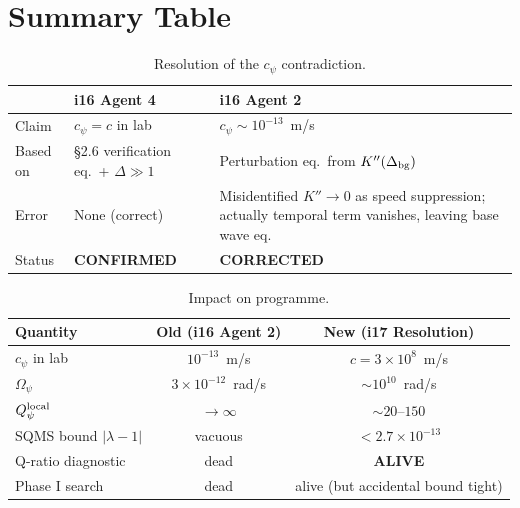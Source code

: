 \documentclass[11pt]{article}
\newcommand{\ee}[1]{\times 10^{#1}}
\newcommand{\Opsi}{\Omega_\psi}
\newcommand{\Qpsi}{Q_\psi}
\theoremstyle{definition}
\theoremstyle{remark}
\begin{document}
\section*{Summary Table}

\begin{table}[H]
\centering
\caption{Resolution of the $c_\psi$ contradiction.}
\begin{tabular}{@{}p{4cm}p{4cm}p{4cm}@{}}
\toprule
& i16 Agent 4 & i16 Agent 2 \\
\midrule
Claim & $c_\psi = c$ in lab & $c_\psi \sim 10^{-13}$~m/s \\
Based on & \S2.6 verification eq.\ + $\Delta \gg 1$ & Perturbation eq.\ from $K''(\Delta_{\rm bg})$ \\
Error & None (correct) & Misidentified $K'' \to 0$ as speed suppression; actually temporal term vanishes, leaving base wave eq. \\
Status & \textbf{CONFIRMED} & \textbf{CORRECTED} \\
\bottomrule
\end{tabular}
\end{table}

\begin{table}[H]
\centering
\caption{Impact on programme.}
\begin{tabular}{@{}lcc@{}}
\toprule
Quantity & Old (i16 Agent 2) & New (i17 Resolution) \\
\midrule
$c_\psi$ in lab & $10^{-13}$~m/s & $c = 3\ee{8}$~m/s \\
$\Opsi$ & $3\ee{-12}$~rad/s & $\sim 10^{10}$~rad/s \\
$\Qpsi^{\rm local}$ & $\to \infty$ & $\sim 20$--$150$ \\
SQMS bound $|\lambda-1|$ & vacuous & $< 2.7\ee{-13}$ \\
Q-ratio diagnostic & dead & \textbf{ALIVE} \\
Phase I search & dead & alive (but accidental bound tight) \\
\bottomrule
\end{tabular}
\end{table}
\end{document}
